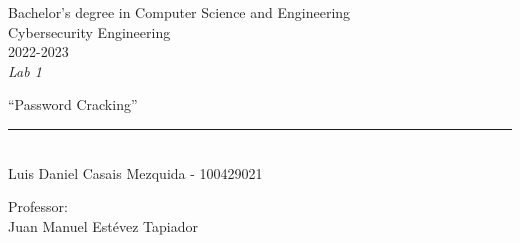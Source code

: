 \begin{titlepage}
    \begin{sffamily}
    \color{azulUC3M}
    \begin{center}
        \begin{figure}[H]
        \end{figure}
        \vspace{1.5cm}
        \begin{Large}
            Bachelor's degree in Computer Science and Engineering\\
            Cybersecurity Engineering\\
            2022-2023\\
            \vspace{2cm}
            \textsl{Lab 1}
            \bigskip

        \end{Large}
            {\Huge ``Password Cracking''}\\
            \vspace*{0.5cm}
            \rule{10.5cm}{0.1mm}\\
            \vspace*{0.9cm}
            {\LARGE Luis Daniel Casais Mezquida - 100429021}\\
            \vspace*{0.2cm}

            \vspace*{0.8cm}
        \begin{Large}
            Professor:\\
            Juan Manuel Estévez Tapiador\\
        \end{Large}
    \end{center}
    \vfill

    \end{sffamily}
\end{titlepage}
